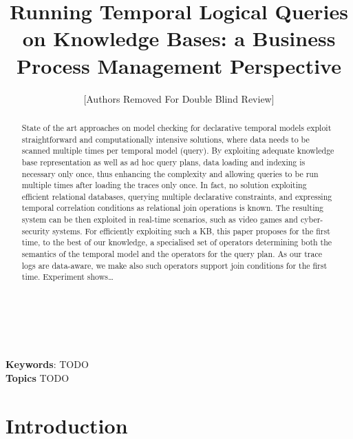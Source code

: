 \documentclass[11pt]{article}
\begin{document}
\title{Running Temporal Logical Queries on Knowledge Bases: a Business Process Management Perspective}

\author{[Authors Removed For Double Blind Review]}

\maketitle
~\\
\begin{abstract}
State of the art approaches on model checking for declarative temporal models exploit straightforward and computationally intensive solutions, where data needs to be scanned multiple times per temporal model (query). By exploiting adequate knowledge base representation as well as ad hoc query plans, data loading and indexing is necessary only once, thus enhancing the complexity and allowing queries to be run multiple times after loading the traces only once. In fact, no solution exploiting efficient relational databases, querying multiple declarative constraints, and expressing temporal correlation conditions as relational join operations is known. The resulting system can be then exploited in real-time scenarios, such as video games and cyber-security systems. For efficiently exploiting such a KB, this paper proposes for the first time, to the best of our knowledge, a specialised set of operators determining both the semantics of the temporal model and the operators for the query plan. As our trace logs are data-aware, we make also such operators support join conditions for the first time. Experiment shows\dots
\end{abstract}
~\\

{\bf Keywords}: TODO
~\\

{\bf Topics} TODO
~\\


\section{Introduction}
\end{document}
